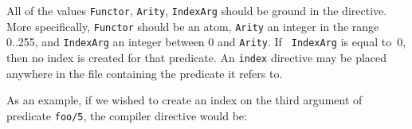 All of the values {\tt Functor}, {\tt Arity}, {\tt IndexArg}
should be ground in the directive.  More specifically, {\tt Functor}
should be an atom, {\tt Arity} an integer in the range 0..255, and
{\tt IndexArg} an integer between 0 and {\tt Arity}.  If {\tt
  IndexArg} is equal to~0, then no index is created for that
predicate. An {\tt index} directive may be placed anywhere in the file
containing the predicate it refers to.

As an example, if we wished to create an index on the third argument 
of predicate {\tt foo/5}, the compiler directive would be:



